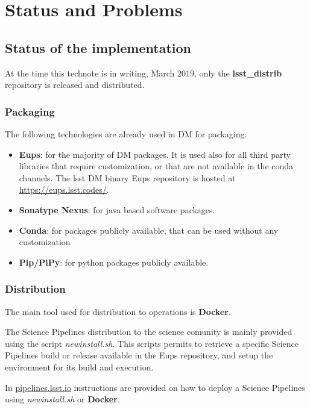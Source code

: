 \section{Status and Problems} \label{sec:statusAndProblems}

\subsection{Status of the implementation} \label{sec:status}

At the time this technote is in writing, March 2019, only the \textbf{lsst\_distrib} repository is released and distributed.


\subsubsection{Packaging} \label{sec:statusPkgs}

The following technologies are already used in DM for packaging:

\begin{itemize}
\item {\bf Eups}: for the majority of DM packages. It is used also for all third party libraries that require customization, or that are not available in the conda channels. The lsst DM binary Eups repository is hosted at \url{https://eups.lsst.codes/}. 
\item {\bf Sonatype Nexus}: for java based software packages.
\item {\bf Conda}: for packages publicly available, that can be used without any customization
\item {\bf Pip/PiPy}: for python packages publicly available.
\end{itemize}


\subsubsection{Distribution} \label{sec:statusDistrib}

The main tool used for distribution to operations is \textbf{Docker}. 

The Science Pipelines distribution to the science comunity is mainly provided using the script \textit{newinstall.sh}. 
This scripts permits to retrieve a specific Science Pipelines build or release available in the Eups repository, and setup the environment for its build and execution.

In \url{pipelines.lsst.io} instructions are provided on how to deploy a Science Pipelines using \textit{newinstall.sh} or \textbf{Docker}.



